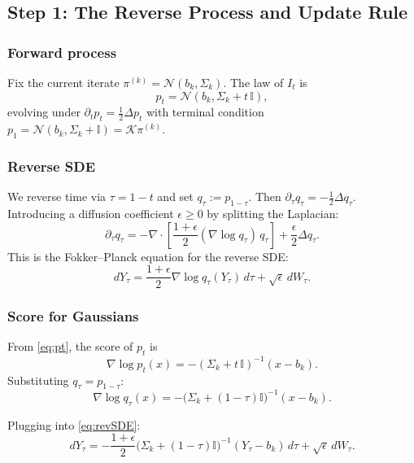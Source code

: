 \documentclass[12pt,fleqn]{article}
\numberwithin{equation}{section}
\newcommand{\N}{\mathcal{N}}
\newcommand{\I}{\mathbb{I}}
\begin{document}
\subsection{Step 1: The Reverse Process and Update Rule}

\subsubsection{Forward process}

Fix the current iterate $\pi^{(k)} = \N(b_k, \Sigma_k)$. The law of $I_t$ is
\begin{equation}
	p_t = \N(b_k, \Sigma_k + t\,\I), \label{eq:pt}
\end{equation}
evolving under $\partial_t p_t = \frac{1}{2}\Delta p_t$ with terminal condition $p_1 = \N(b_k, \Sigma_k + \I) = \mathcal K \pi^{(k)}$.

\subsubsection{Reverse SDE}

We reverse time via $\tau = 1 - t$ and set $q_\tau := p_{1-\tau}$. Then $\partial_\tau q_\tau = -\frac{1}{2}\Delta q_\tau$. Introducing a diffusion coefficient $\epsilon \geq 0$ by splitting the Laplacian:
\begin{equation}
	\partial_\tau q_\tau = -\nabla \cdot \!\left[\frac{1+\epsilon}{2}(\nabla \log q_\tau)\, q_\tau\right] + \frac{\epsilon}{2}\Delta q_\tau. \label{eq:reverseFP}
\end{equation}
This is the Fokker--Planck equation for the reverse SDE:
\begin{equation}
	dY_\tau = \frac{1+\epsilon}{2}\nabla\log q_\tau(Y_\tau)\,d\tau + \sqrt{\epsilon}\,dW_\tau. \label{eq:revSDE}
\end{equation}

\subsubsection{Score for Gaussians}

From \eqref{eq:pt}, the score of $p_t$ is
\[
	\nabla \log p_t(x) = -(\Sigma_k + t\,\I)^{-1}(x - b_k).
\]
Substituting $q_\tau = p_{1-\tau}$:
\begin{equation}
	\nabla \log q_\tau(x) = -\bigl(\Sigma_k + (1-\tau)\I\bigr)^{-1}(x - b_k). \label{eq:score}
\end{equation}

Plugging into \eqref{eq:revSDE}:
\begin{equation}
	dY_\tau = -\frac{1+\epsilon}{2}\bigl(\Sigma_k + (1-\tau)\I\bigr)^{-1}(Y_\tau - b_k)\,d\tau + \sqrt{\epsilon}\,dW_\tau. \label{eq:revSDE_explicit}
\end{equation}
\end{document}
